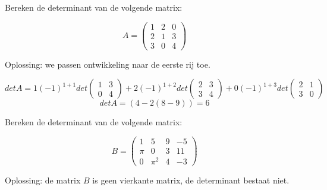 \begin{voorbeeld}
	Bereken de determinant van de volgende matrix:

\[ A=\left( \begin{matrix}
	1 & 2 & 0 \\
	2 & 1 & 3 \\
	3 & 0 & 4 \end{matrix} \right)
	\]
	
	Oplossing: we passen ontwikkeling naar de eerste rij toe.
	
	\[
	det A= 1 (-1)^{1+1} det \left( \begin{matrix} 
	1 & 3 \\ 0 & 4 \end{matrix} \right) + 2 (-1)^{1+2} det \left( \begin{matrix}
	2 & 3 \\ 3 & 4 \end{matrix} \right) + 0 (-1)^{1+3} det \left( \begin{matrix}
	2 & 1 \\ 3 & 0 \end{matrix} \right)
	\]
	\[ det A=(4-2(8-9))=6 \] 

\end{voorbeeld}	
\begin{voorbeeld}
	Bereken de determinant van de volgende matrix:

	 \[ B=\left( \begin{matrix}
	1 & 5 & 9 & -5 \\
	\pi & 0 & 3 & 11 \\
	0 & \pi^2 & 4 & -3
	\end{matrix} \right)
	\]
	
	Oplossing: de matrix $B$ is geen vierkante matrix, de determinant bestaat niet.
\end{voorbeeld}	

